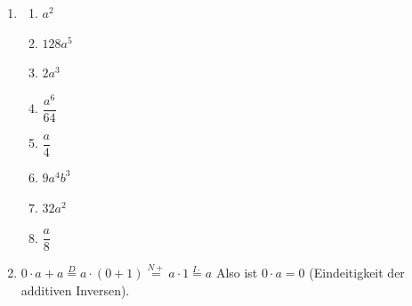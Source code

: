 \begin{enumerate}
    \item
          \begin{enumerate}
              \item \(a^2\)
              \item \(128a^5\)
              \item \(2a^3\)
              \item \(\dfrac{a^6}{64}\)
              \item \(\dfrac{a}{4}\)
              \item \(9a^4b^3\)
              \item \(32a^2\)
              \item \(\dfrac{a}{8}\)
          \end{enumerate}
    \item \(0 \cdot a + a \stackrel{D}{=} a \cdot (0+1) \stackrel{N+}{=} a \cdot 1 \stackrel{I\cdot}{=}a \) Also ist \( 0 \cdot a = 0 \) (Eindeitigkeit der additiven Inversen).
\end{enumerate}




























